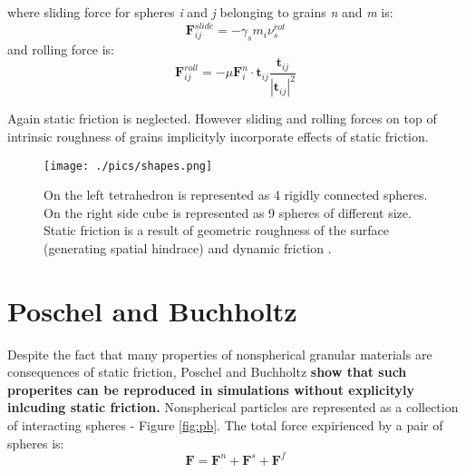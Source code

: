 \documentclass[10pt,a4paper]{article}
\begin{document}
where sliding force for spheres \textit{i} and \textit{j} belonging to grains \textit{n} and \textit{m} is:
\begin{equation}
 \mathbf{F}^{slide}_{ij} = -\gamma_s m_i \nu^{rot}_s
\end{equation}
and rolling force is:
\begin{equation}
 \mathbf{F}^{roll}_{ij} = -\mu\mathbf{F}^{n}_{i} \cdot \mathbf{t}_{ij} \frac{ \mathbf{t}_{ij}} { |\mathbf{t}_{ij}|^2 }
\end{equation}

Again static friction is neglected. %
However sliding and rolling forces on top of intrinsic roughness of grains implicityly incorporate effects of static friction.

\begin{figure}[tb]
\centering
\texttt{[image: ./pics/shapes.png]}
\caption{On the left tetrahedron is represented as 4 rigidly connected spheres. On the right side cube is represented as 9 spheres of different size.
Static friction is a result of geometric roughness of the surface (generating spatial hindrace) and dynamic friction \cite{sok93, mucha05}.}
\label{fig:shapes}
\end{figure}

\section{Poschel and Buchholtz \cite{pb93, pb94, pb95}}
Despite the fact that many properties of nonspherical granular materials are consequences of static friction,
Poschel and Buchholtz \textbf{show that such properites can be reproduced in simulations without explicityly inlcuding static friction.}
Nonspherical particles are represented as a collection of interacting spheres - Figure \ref{fig:pb}. 
The total force expirienced by a pair of spheres is:
\begin{equation}
 \mathbf{F} = \mathbf{F}^{n} + \mathbf{F}^{s} + \mathbf{F}^{f}
\end{equation}
\end{document}
